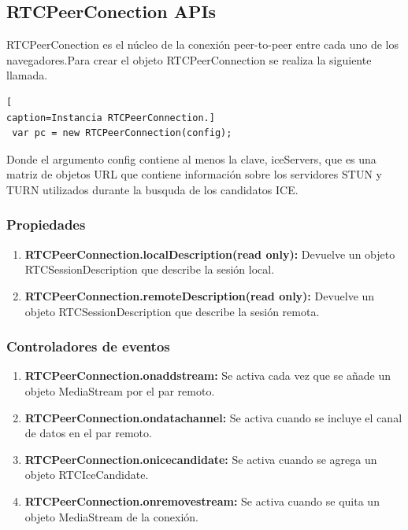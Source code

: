 \subsection{RTCPeerConection APIs}
RTCPeerConection es el núcleo de la conexión peer-to-peer entre cada uno de los navegadores.Para crear el objeto RTCPeerConnection se realiza la siguiente llamada.
\begin{lstlisting}[
caption=Instancia RTCPeerConnection.]
 var pc = new RTCPeerConnection(config);
\end{lstlisting}
Donde el argumento config contiene al menos la clave, iceServers, que es una matriz de objetos URL que contiene información sobre los servidores STUN y TURN utilizados durante la busquda de los candidatos ICE.
\subsubsection*{Propiedades}
\begin{enumerate}
  \item \textbf{RTCPeerConnection.localDescription(read only):} Devuelve un objeto RTCSessionDescription que describe la sesión local.
  \item \textbf{RTCPeerConnection.remoteDescription(read only):} Devuelve un objeto RTCSessionDescription que describe la sesión remota.
\end{enumerate}
\subsubsection*{Controladores de eventos}
\begin{enumerate}
  \item \textbf{RTCPeerConnection.onaddstream:} Se activa cada vez que se añade un objeto MediaStream por el par remoto.
  \item \textbf{RTCPeerConnection.ondatachannel:} Se activa cuando se incluye el canal de datos en el par remoto.
  \item \textbf{RTCPeerConnection.onicecandidate:} Se activa cuando se agrega un objeto RTCIceCandidate.
  \item \textbf{RTCPeerConnection.onremovestream:} Se activa cuando se quita un objeto MediaStream de la conexión.
\end{enumerate}
